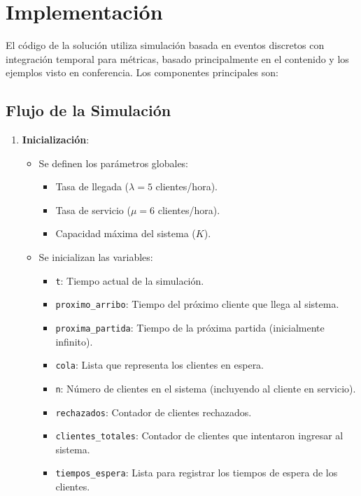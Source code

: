 \documentclass{article}
\begin{document}
\section{Implementación}
El código de la solución utiliza simulación basada en eventos discretos con integración temporal para métricas, basado
principalmente en el contenido y los ejemplos visto en conferencia. Los componentes principales son:

\subsection{Flujo de la Simulación}

\begin{enumerate}
    \item \textbf{Inicialización}:
    \begin{itemize}
        \item Se definen los parámetros globales:
        \begin{itemize}
            \item Tasa de llegada (\(\lambda = 5\) clientes/hora).
            \item Tasa de servicio (\(\mu = 6\) clientes/hora).
            \item Capacidad máxima del sistema (\(K\)).
        \end{itemize}
        \item Se inicializan las variables:
        \begin{itemize}
            \item \texttt{t}: Tiempo actual de la simulación.
            \item \texttt{proximo\_arribo}: Tiempo del próximo cliente que llega al sistema.
            \item \texttt{proxima\_partida}: Tiempo de la próxima partida (inicialmente infinito).
            \item \texttt{cola}: Lista que representa los clientes en espera.
            \item \texttt{n}: Número de clientes en el sistema (incluyendo al cliente en servicio).
            \item \texttt{rechazados}: Contador de clientes rechazados.
            \item \texttt{clientes\_totales}: Contador de clientes que intentaron ingresar al sistema.
            \item \texttt{tiempos\_espera}: Lista para registrar los tiempos de espera de los clientes.
        \end{itemize}
    \end{itemize}


\end{enumerate}
\end{document}

